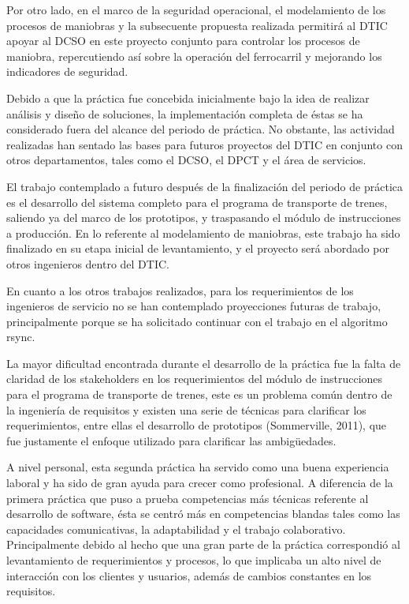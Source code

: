 \documentclass[oneside,12pt, letterpaper, titlepage]{book}
\begin{document}
Por otro lado, en el marco de la seguridad operacional, el modelamiento de los procesos de maniobras y la subsecuente propuesta realizada permitirá al DTIC apoyar al DCSO en este proyecto conjunto para controlar los procesos de maniobra, repercutiendo así sobre la operación del ferrocarril y mejorando los indicadores de seguridad.

Debido a que la práctica fue concebida inicialmente bajo la idea de realizar análisis y diseño de soluciones, la implementación completa de éstas se ha considerado fuera del alcance del periodo de práctica. No obstante, las actividad realizadas han sentado las bases para futuros proyectos del DTIC en conjunto con otros departamentos, tales como el DCSO, el DPCT y el área de servicios.

El trabajo contemplado a futuro después de la finalización del periodo de práctica es el desarrollo del sistema completo para el programa de transporte de trenes, saliendo ya del marco de los prototipos, y traspasando el módulo de instrucciones a producción. En lo referente al modelamiento de maniobras, este trabajo ha sido finalizado en su etapa inicial de levantamiento, y el proyecto será abordado por otros ingenieros dentro del DTIC. 

En cuanto a los otros trabajos realizados, para los requerimientos de los ingenieros de servicio no se han contemplado proyecciones futuras de trabajo, principalmente porque se ha solicitado continuar con el trabajo en el algoritmo rsync.

La mayor dificultad encontrada durante el desarrollo de la práctica fue la falta de claridad de los stakeholders en los requerimientos del módulo de instrucciones para el programa de transporte de trenes, este es un problema común dentro de la ingeniería de requisitos y existen una serie de técnicas para clarificar los requerimientos, entre ellas el desarrollo de prototipos (Sommerville, 2011), que fue justamente el enfoque utilizado para clarificar las ambigüedades.

A nivel personal, esta segunda práctica ha servido como una buena experiencia laboral y ha sido de gran ayuda para crecer como profesional. A diferencia de la primera práctica que puso a prueba competencias más técnicas referente al desarrollo de software, ésta se centró más en competencias blandas tales como las capacidades comunicativas, la adaptabilidad y el trabajo colaborativo.  Principalmente debido al hecho que una gran parte de la práctica correspondió al levantamiento de requerimientos y procesos, lo que implicaba un alto nivel de interacción con los clientes y usuarios, además de cambios constantes en los requisitos.
\end{document}
